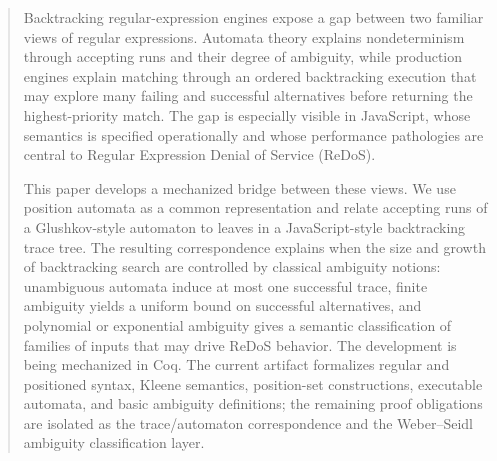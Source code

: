 \begin{abstract}
Backtracking regular-expression engines expose a gap between two familiar views of
regular expressions.  Automata theory explains nondeterminism through accepting
runs and their degree of ambiguity, while production engines explain matching
through an ordered backtracking execution that may explore many failing and
successful alternatives before returning the highest-priority match.  The gap is
especially visible in JavaScript, whose semantics is specified operationally and
whose performance pathologies are central to Regular Expression Denial of Service
(ReDoS).

This paper develops a mechanized bridge between these views.  We use
position automata as a common representation and relate accepting runs of a
Glushkov-style automaton to leaves in a JavaScript-style backtracking trace tree.
The resulting correspondence explains when the size and growth of backtracking
search are controlled by classical ambiguity notions: unambiguous automata induce
at most one successful trace, finite ambiguity yields a uniform bound on
successful alternatives, and polynomial or exponential ambiguity gives a semantic
classification of families of inputs that may drive ReDoS behavior.  The
development is being mechanized in Coq.  The current artifact formalizes regular
and positioned syntax, Kleene semantics, position-set constructions, executable
automata, and basic ambiguity definitions; the remaining proof obligations are
isolated as the trace/automaton correspondence and the Weber--Seidl ambiguity
classification layer.
\end{abstract}
